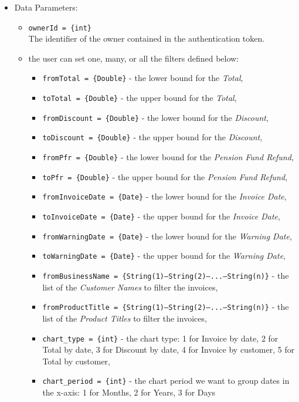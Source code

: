 \begin{itemize}
    \item Data Parameters: 
    \begin{itemize}
        \item \texttt{ownerId = \{int\}} \\
        The identifier of the owner contained in the authentication token.
        \item the user can set one, many, or all the filters defined below: 
        \begin{itemize}
            \item \texttt{fromTotal = \{Double\}} - the lower bound for the \textit{Total},
            \item \texttt{toTotal = \{Double\}} - the upper bound for the \textit{Total},
            \item \texttt{fromDiscount = \{Double\}} - the lower bound for the \textit{Discount}, 
            \item \texttt{toDiscount = \{Double\}} - the upper bound for the \textit{Discount},
            \item \texttt{fromPfr = \{Double\}} - the lower bound for the \textit{Pension Fund Refund}, 
            \item \texttt{toPfr = \{Double\}} - the upper bound for the \textit{Pension Fund Refund},
            \item \texttt{fromInvoiceDate = \{Date\}} - the lower bound for the \textit{Invoice Date}, 
            \item \texttt{toInvoiceDate = \{Date\}} - the upper bound for the \textit{Invoice Date},
            \item \texttt{fromWarningDate = \{Date\}} - the lower bound for the \textit{Warning Date}, 
            \item \texttt{toWarningDate = \{Date\}} - the upper bound for the \textit{Warning Date},
            \item \texttt{fromBusinessName = \{String(1)---String(2)---...---String(n)\}} - the list of the \textit{Customer Names} to filter the invoices,
            \item \texttt{fromProductTitle = \{String(1)---String(2)---...---String(n)\}} - the list of the \textit{Product Titles} to filter the invoices,
            \item \texttt{chart\_type = \{int\}} - the chart type: 1 for Invoice by date, 2 for Total by date, 3 for Discount by date, 4 for Invoice by customer, 5 for Total by customer,
            \item \texttt{chart\_period = \{int\}} - the chart period we want to group dates in the x-axis: 1 for Months, 2 for Years, 3 for Days
        \end{itemize}     
    \end{itemize}
    

\end{itemize}
